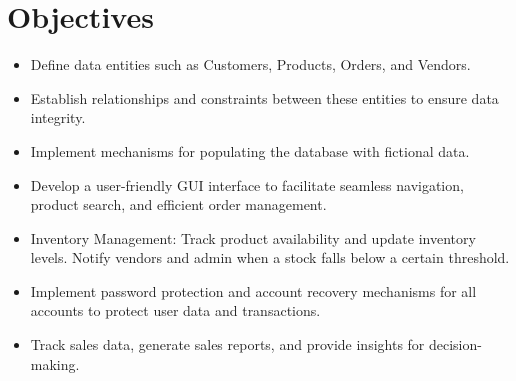 \documentclass{article}
\begin{document}
\section{Objectives}
\begin{itemize}
\item Define data entities such as Customers, Products, Orders, and Vendors.

\item Establish relationships and constraints between these entities to ensure data integrity.

\item Implement mechanisms for populating the database with fictional data.

\item Develop a user-friendly GUI interface to facilitate seamless navigation, product search, and efficient order management.

\item Inventory Management: Track product availability and update inventory levels. Notify vendors and admin when a stock falls below a certain threshold.

\item Implement password protection and account recovery mechanisms for all accounts to protect user data and transactions.

\item Track sales data, generate sales reports, and provide insights for decision-making.
\end{itemize}
\
\end{document}
